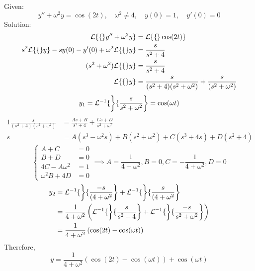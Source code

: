 \documentclass[diffeq.tex]{subfiles}
\begin{document}
\begin{homework*}[255.15]
    Given:
    \begin{equation}
        y'' + \omega^{2}y = \cos(2t),\quad \omega^{2} \neq 4,\quad y(0) = 1,\quad y'(0) = 0
    \end{equation}
    Solution:
    \begin{alignat}{1}
        \mathcal{L}\{\{\}y'' + \omega^{2}y\} &= \mathcal{L}\{\{\}\cos(2t)\}\\
        s^{2}\mathcal{L}\{\{\}y\} - sy(0) - y'(0) + \omega^{2}\mathcal{L}\{\{\}y\} &= \frac{s}{s^{2} + 4}\\
        (s^{2} + \omega^{2})\mathcal{L}\{\{\}y\} &= \frac{s}{s^{2} + 4}\\
        \mathcal{L}\{\{\}y\} &= \frac{s}{(s^{2} + 4)(s^{2} + \omega^{2})} + \frac{s}{(s^{2} + \omega^{2})}
    \end{alignat}
    \begin{equation}
        y_{1} = \mathcal{L}^{-1}\{\left\}\{\frac{s}{s^{2} + \omega^{2}}\right\} = \cos(\omega t)
    \end{equation}
    \begin{alignat}{1}
        \frac{s}{(s^{2} + 4)(s^{2} + \omega^{2})} &= \frac{As + B}{s^{2} + 4} + \frac{Cs + D}{s^{2} + \omega^{2}}\\
        s &= A(s^{3} - \omega^{2}s) + B(s^{2} + \omega^{2}) + C(s^{3} + 4s) + D(s^{2} + 4)
    \end{alignat}
    \begin{equation}
        \begin{cases}
            A + C &= 0\\
            B + D &= 0\\
            4C - A\omega^{2} &= 1\\
            \omega^{2}B + 4D &= 0
        \end{cases}
        \implies A = \frac{1}{4 + \omega^{2}}, B = 0, C = -\frac{1}{4 + \omega^{2}}, D = 0
    \end{equation}
    \begin{alignat}{1}
        y_{2} &= \mathcal{L}^{-1}\{\left\}\{\frac{-s}{(4 + \omega^{2}}\right\} + \mathcal{L}^{-1}\{\left\}\{\frac{s}{(4 + \omega^{2}}\right\}\\
        &= \frac{1}{4 + \omega^{2}}\left(\mathcal{L}^{-1}\{\left\}\{\frac{s}{s^{2} + 4}\right\} + \mathcal{L}^{-1}\{\left\}\{\frac{-s}{s^{2} + \omega^{2}}\right\}\right)\\
        &= \frac{1}{4 + \omega^{2}}\left(\cos(2t) - \cos(\omega t)\right)\\
    \end{alignat}
    Therefore,
    \begin{equation}
        y = \frac{1}{4 + \omega^{2}}\left(\cos(2t) - \cos(\omega t)\right) + \cos(\omega t)
    \end{equation}
\end{homework*}
\end{document}
